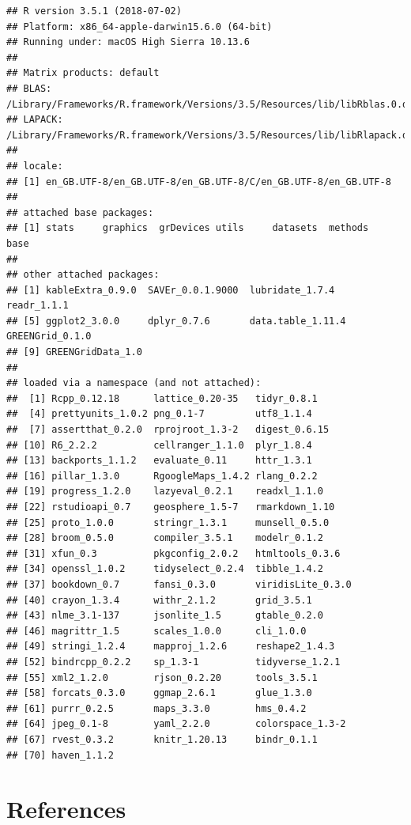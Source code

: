 \documentclass[]{article}
\theoremstyle{definition}
\theoremstyle{definition}
\theoremstyle{definition}
\theoremstyle{remark}
\begin{document}
\begin{verbatim}
## R version 3.5.1 (2018-07-02)
## Platform: x86_64-apple-darwin15.6.0 (64-bit)
## Running under: macOS High Sierra 10.13.6
## 
## Matrix products: default
## BLAS: /Library/Frameworks/R.framework/Versions/3.5/Resources/lib/libRblas.0.dylib
## LAPACK: /Library/Frameworks/R.framework/Versions/3.5/Resources/lib/libRlapack.dylib
## 
## locale:
## [1] en_GB.UTF-8/en_GB.UTF-8/en_GB.UTF-8/C/en_GB.UTF-8/en_GB.UTF-8
## 
## attached base packages:
## [1] stats     graphics  grDevices utils     datasets  methods   base     
## 
## other attached packages:
## [1] kableExtra_0.9.0  SAVEr_0.0.1.9000  lubridate_1.7.4   readr_1.1.1      
## [5] ggplot2_3.0.0     dplyr_0.7.6       data.table_1.11.4 GREENGrid_0.1.0  
## [9] GREENGridData_1.0
## 
## loaded via a namespace (and not attached):
##  [1] Rcpp_0.12.18      lattice_0.20-35   tidyr_0.8.1      
##  [4] prettyunits_1.0.2 png_0.1-7         utf8_1.1.4       
##  [7] assertthat_0.2.0  rprojroot_1.3-2   digest_0.6.15    
## [10] R6_2.2.2          cellranger_1.1.0  plyr_1.8.4       
## [13] backports_1.1.2   evaluate_0.11     httr_1.3.1       
## [16] pillar_1.3.0      RgoogleMaps_1.4.2 rlang_0.2.2      
## [19] progress_1.2.0    lazyeval_0.2.1    readxl_1.1.0     
## [22] rstudioapi_0.7    geosphere_1.5-7   rmarkdown_1.10   
## [25] proto_1.0.0       stringr_1.3.1     munsell_0.5.0    
## [28] broom_0.5.0       compiler_3.5.1    modelr_0.1.2     
## [31] xfun_0.3          pkgconfig_2.0.2   htmltools_0.3.6  
## [34] openssl_1.0.2     tidyselect_0.2.4  tibble_1.4.2     
## [37] bookdown_0.7      fansi_0.3.0       viridisLite_0.3.0
## [40] crayon_1.3.4      withr_2.1.2       grid_3.5.1       
## [43] nlme_3.1-137      jsonlite_1.5      gtable_0.2.0     
## [46] magrittr_1.5      scales_1.0.0      cli_1.0.0        
## [49] stringi_1.2.4     mapproj_1.2.6     reshape2_1.4.3   
## [52] bindrcpp_0.2.2    sp_1.3-1          tidyverse_1.2.1  
## [55] xml2_1.2.0        rjson_0.2.20      tools_3.5.1      
## [58] forcats_0.3.0     ggmap_2.6.1       glue_1.3.0       
## [61] purrr_0.2.5       maps_3.3.0        hms_0.4.2        
## [64] jpeg_0.1-8        yaml_2.2.0        colorspace_1.3-2 
## [67] rvest_0.3.2       knitr_1.20.13     bindr_0.1.1      
## [70] haven_1.1.2
\end{verbatim}

\section*{References}\label{references}
\end{document}
